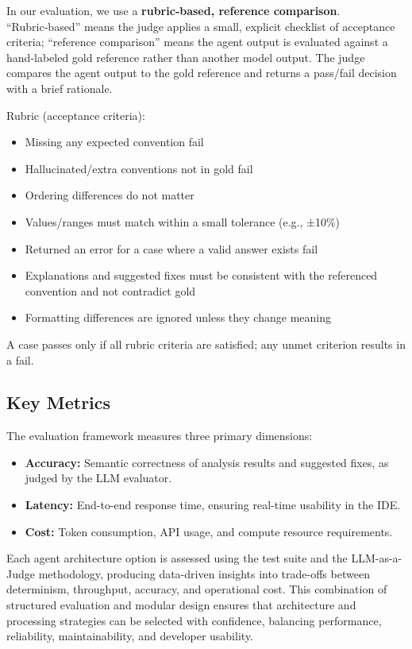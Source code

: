 \begin{spacing}{1.2}
In our evaluation, we use a \textbf{rubric‑based, reference comparison}. “Rubric‑based” means the judge applies a small, explicit checklist of acceptance criteria; “reference comparison” means the agent output is evaluated against a hand‑labeled gold reference rather than another model output. The judge compares the agent output to the gold reference and returns a pass/fail decision with a brief rationale.

Rubric (acceptance criteria):
\begin{itemize}
    \item Missing any expected convention \textrightarrow{} fail
    \item Hallucinated/extra conventions not in gold \textrightarrow{} fail
    \item Ordering differences do not matter
    \item Values/ranges must match within a small tolerance (e.g., ±10\%)
    \item Returned an error for a case where a valid answer exists \textrightarrow{} fail
    \item Explanations and suggested fixes must be consistent with the referenced convention and not contradict gold
    \item Formatting differences are ignored unless they change meaning
\end{itemize}

\noindent A case passes only if all rubric criteria are satisfied; any unmet criterion results in a fail.

\subsection{Key Metrics}
The evaluation framework measures three primary dimensions:

\begin{itemize}
    \item \textbf{Accuracy:} Semantic correctness of analysis results and suggested fixes, as judged by the LLM evaluator.
    \item \textbf{Latency:} End-to-end response time, ensuring real-time usability in the IDE.
    \item \textbf{Cost:} Token consumption, API usage, and compute resource requirements.
\end{itemize}

Each agent architecture option is assessed using the test suite and the LLM-as-a-Judge methodology, producing data-driven insights into trade-offs between determinism, throughput, accuracy, and operational cost. This combination of structured evaluation and modular design ensures that architecture and processing strategies can be selected with confidence, balancing performance, reliability, maintainability, and developer usability.



\end{spacing}
